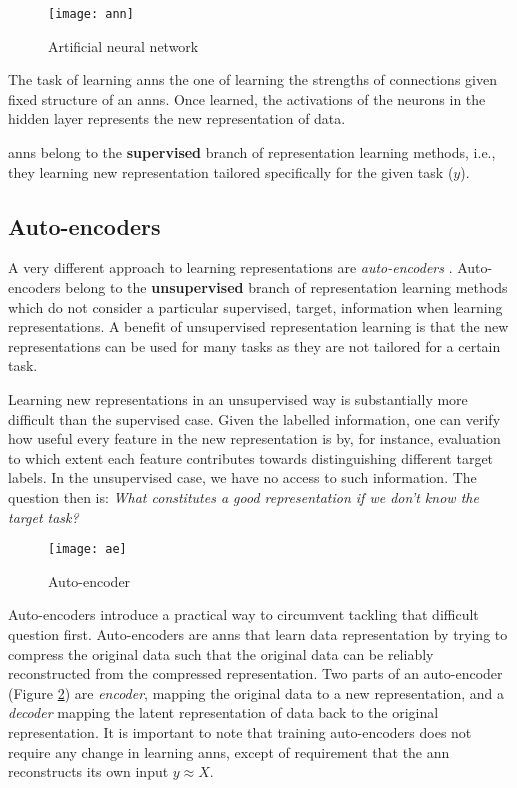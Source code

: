 \begin{figure}
	\centering
	\texttt{[image: ann]}
	\caption{Artificial neural network}
	\label{fig:ann}
\end{figure}


The task of learning \gls{ann}s the one of learning the strengths of connections given fixed structure of an \gls{ann}s.
Once learned, the activations of the neurons in the hidden layer represents the new representation of data.


\gls{ann}s belong to the \textbf{supervised} branch of representation learning methods, i.e., they learning new representation tailored specifically for the given task ($y$).




\subsection{Auto-encoders}


A very different approach to learning representations are \textit{auto-encoders} \cite{Hinton504}.
Auto-encoders belong to the \textbf{unsupervised} branch of representation learning methods which do not consider a particular supervised, target, information when learning representations.
A benefit of unsupervised representation learning is that the new representations can be used for many tasks as they are not tailored for a certain task.


Learning new representations in an unsupervised way is substantially more difficult than the supervised case.
Given the labelled information, one can verify how useful every feature in the new representation is  by, for instance, evaluation to which extent each feature contributes towards distinguishing different target labels.
In the unsupervised case, we have no access to such information.
The question then is: \textit{What constitutes a good representation if we don't know the target task?}


\begin{figure}
	\centering
	\texttt{[image: ae]}
	\caption{Auto-encoder}
	\label{fig:ae}
\end{figure}



Auto-encoders introduce a practical way to circumvent tackling that difficult question first.
Auto-encoders are \gls{ann}s that learn data representation by trying to compress the original data such that the original data can be reliably reconstructed from the compressed representation.
Two parts of an auto-encoder (Figure \ref{fig:ae}) are \textit{encoder}, mapping the original data to a new representation, and a \textit{decoder} mapping the latent representation of data back to the original representation.
It is important to note that training auto-encoders does not require any change in learning \gls{ann}s, except of requirement that the \gls{ann} reconstructs its own input $y \approx X$.




